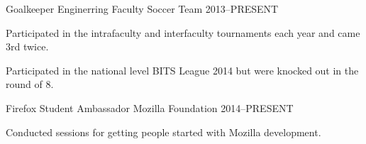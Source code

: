 \begin{cventries}
\cventry%
  {Goalkeeper} %
  {Enginerring Faculty Soccer Team} %
  {} %
  {2013--PRESENT} %
  {%
    \begin{cvitems} %
      \item{Participated in the intrafaculty and interfaculty tournaments each
            year and came 3rd twice.}
      \item{Participated in the national level BITS League 2014 but were
            knocked out in the round of 8.}
    \end{cvitems}
  }

\cventry%
  {Firefox Student Ambassador} %
  {Mozilla Foundation} %
  {} %
  {2014--PRESENT} %
  {%
    \begin{cvitems} %
      \item{Conducted sessions for getting people started with Mozilla
            development.}
    \end{cvitems}
  }

\end{cventries}
